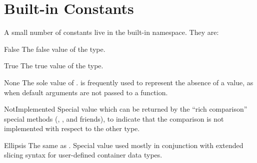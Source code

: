 \section{Built-in Constants}

A small number of constants live in the built-in namespace.  They are:

\begin{datadesc}{False}
  The false value of the  type.
\end{datadesc}

\begin{datadesc}{True}
  The true value of the  type.
\end{datadesc}

\begin{datadesc}{None}
  The sole value of .   is
  frequently used to represent the absence of a value, as when default
  arguments are not passed to a function.
\end{datadesc}

\begin{datadesc}{NotImplemented}
  Special value which can be returned by the ``rich comparison''
  special methods (, , and friends),
  to indicate that the comparison is not implemented with respect to
  the other type.
\end{datadesc}

\begin{datadesc}{Ellipsis}
  The same as .
  Special value used mostly in conjunction with extended slicing syntax
  for user-defined container data types.
\end{datadesc}
